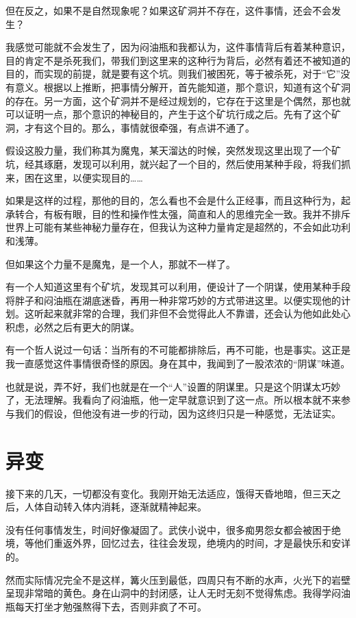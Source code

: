 但在反之，如果不是自然现象呢？如果这矿洞并不存在，这件事情，还会不会发生？

我感觉可能就不会发生了，因为闷油瓶和我都认为，这件事情背后有着某种意识，目的肯定不是杀死我们，带我们到这里来的这种行为背后，必然有着还不被知道的目的，而实现的前提，就是要有这个坑。则我们被困死，等于被杀死，对于“它”没有意义。根据以上推断，把事情分解开，首先能知道，那个意识，知道有这个矿洞的存在。另一方面，这个矿洞并不是经过规划的，它存在于这里是个偶然，那也就可以证明一点，那个意识的神秘目的，产生于这个矿坑行成之后。先有了这个矿洞，才有这个目的。那么，事情就很牵强，有点讲不通了。

假设这股力量，我们称其为魔鬼，某天溜达的时候，突然发现这里出现了一个矿坑，经其琢磨，发现可以利用，就兴起了一个目的，然后使用某种手段，将我们抓来，困在这里，以便实现目的……

如果是这样的过程，那他的目的，怎么看也不会是什么正经事，而且这种行为，起承转合，有板有眼，目的性和操作性太强，简直和人的思维完全一致。我并不排斥世界上可能有某些神秘力量存在，但我认为这种力量肯定是超然的，不会如此功利和浅薄。

但如果这个力量不是魔鬼，是一个人，那就不一样了。

有一个人知道这里有个矿坑，发现其可以利用，便设计了一个阴谋，使用某种手段将胖子和闷油瓶在湖底迷昏，再用一种非常巧妙的方式带进这里。以便实现他的计划。这听起来就非常的合理，我们非但不会觉得此人不靠谱，还会认为他如此处心积虑，必然之后有更大的阴谋。

有一个哲人说过一句话：当所有的不可能都排除后，再不可能，也是事实。这正是我一直感觉这件事情很奇怪的原因。身在其中，我闻到了一股浓浓的“阴谋”味道。

也就是说，弄不好，我们也就是在一个“人”设置的阴谋里。只是这个阴谋太巧妙了，无法理解。我看向了闷油瓶，他一定早就意识到了这一点。所以根本就不来参与我们的假设，但他没有进一步的行动，因为这终归只是一种感觉，无法证实。

\chapter{异变}

接下来的几天，一切都没有变化。我刚开始无法适应，饿得天昏地暗，但三天之后，人体自动转入体内消耗，逐渐就精神起来。

没有任何事情发生，时间好像凝固了。武侠小说中，很多痴男怨女都会被困于绝境，等他们重返外界，回忆过去，往往会发现，绝境内的时间，才是最快乐和安详的。

然而实际情况完全不是这样，篝火压到最低，四周只有不断的水声，火光下的岩壁呈现非常暗的黄色。身在山洞中的封闭感，让人无时无刻不觉得焦虑。我得学闷油瓶每天打坐才勉强熬得下去，否则非疯了不可。

